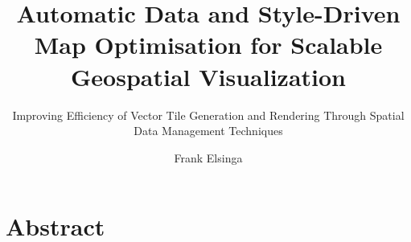 \documentclass[
  a4paper,            %
  english,            %
]{tumbook}
\title{Automatic Data and Style-Driven Map Optimisation for Scalable Geospatial Visualization}
\subtitle{Improving Efficiency of Vector Tile Generation and Rendering Through Spatial Data Management Techniques}
\author{Frank Elsinga}
\begin{document}
\frontmatter
\maketitle
\chapter{Abstract}

\tableofcontents

\mainmatter







\backmatter
\appendix


\printacronyms[name=Acronyms]
\listoffigures
\listoftables
\begin{sloppypar}
\printbibliography
\end{sloppypar}
\end{document}
